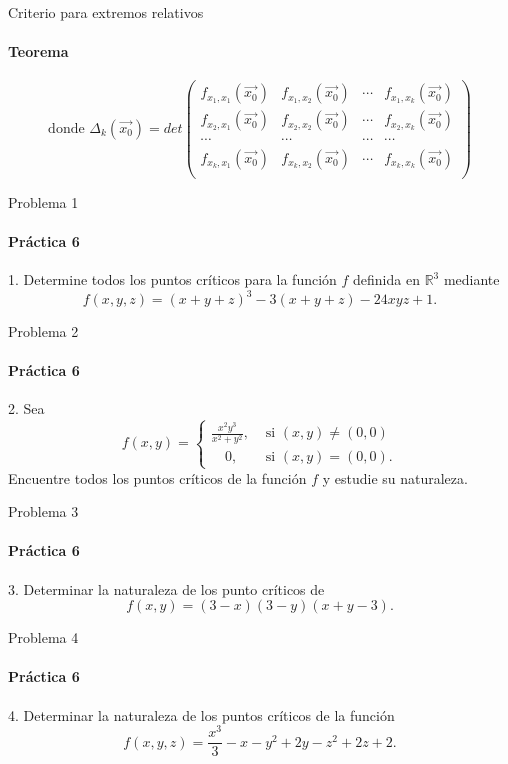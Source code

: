 \documentclass{plantillaPPT}
\begin{document}
\begin{frame}{Criterio para extremos relativos}
\framesubtitle{Teorema}

\[\text{donde } \Delta_k(\vec{x_0}) = det\left(
\begin{matrix}
    f_{x_1,x_1}(\vec{x_0}) & f_{x_1,x_2}(\vec{x_0}) & \cdots & f_{x_1,x_k}(\vec{x_0})\\
    f_{x_2,x_1}(\vec{x_0}) & f_{x_2,x_2}(\vec{x_0}) & \cdots & f_{x_2,x_k}(\vec{x_0})\\
    \cdots & \cdots & \cdots & \cdots \\
    f_{x_k,x_1}(\vec{x_0}) & f_{x_k,x_2}(\vec{x_0}) & \cdots & f_{x_k,x_k}(\vec{x_0})\\
\end{matrix}
\right) \]
    
\end{frame}

\begin{frame}{Problema 1}
\framesubtitle{Práctica 6}

1. Determine todos los puntos críticos para la función $f$ definida en $\mathbb{R}^3$ mediante
\[f(x,y,z) = (x+y+z)^3-3(x+y+z)-24xyz+1.\]
    
\end{frame}

\begin{frame}{Problema 2}
\framesubtitle{Práctica 6}

2. Sea
\[
f(x,y) = 
\begin{cases}
    \frac{x^2y^3}{x^2+y^2},& \text{ si } (x,y)\neq(0,0) \\
    \quad 0 ,& \text{ si } (x,y)=(0,0).
\end{cases}
\]
Encuentre todos los puntos críticos de la función $f$ y estudie su naturaleza.
    
\end{frame}

\begin{frame}{Problema 3}
\framesubtitle{Práctica 6}

3. Determinar la naturaleza de los punto críticos de
\[
f(x,y)=(3-x)(3-y)(x+y-3).
\]

\end{frame}

\begin{frame}{Problema 4}
\framesubtitle{Práctica 6}

4. Determinar la naturaleza de los puntos críticos de la función
\[
f(x,y,z) = \frac{x^3}{3}-x-y^2+2y-z^2+2z+2.
\]
    
\end{frame}
\end{document}
